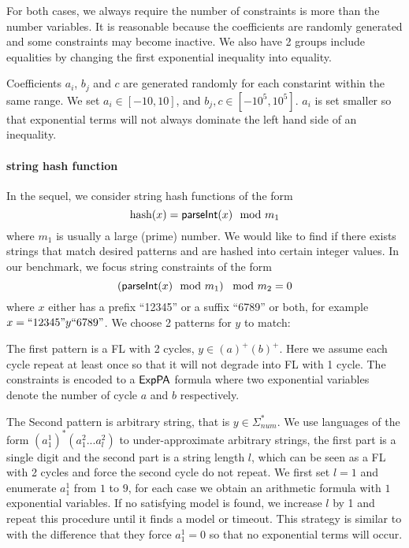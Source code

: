 For both cases, we always require the number of constraints is more than the number variables. It is reasonable because the coefficients are randomly generated and some constraints may become inactive. We also have 2 groups include equalities by changing the first exponential inequality into equality.  

Coefficients $a_i$, $b_j$ and $c$ are generated randomly for each constarint within the same range. We set $a_i\in [-10,10]$, and $b_j,c\in[-10^5,10^5]$. $a_i$ is set smaller so that exponential terms will not always dominate the left hand side of an inequality.

\paragraph{string hash function}

In the sequel, we consider string hash functions of the form  
\begin{equation}
    \text{hash}(x)= \textsf{parseInt}(x) \mod m_1  \notag
\end{equation}
where $m_1$ is usually a large (prime) number. We would like to find if there exists strings that match desired patterns and are hashed into certain integer values. In our benchmark, we focus string constraints of the form
\begin{equation}
    \left( \textsf{parseInt}(x) \mod m_1\right) \mod m_2 = 0   \notag
\end{equation}
where $x$ either has a prefix ``12345'' or a suffix ``6789'' or both, for example $x=``12345"y``6789"$. We choose 2 patterns for $y$ to match: 

The first pattern is a FL with 2 cycles, $y \in (a)^+(b)^+$. Here we assume each cycle repeat at least once so that it will not degrade into FL with 1 cycle. The constraints is encoded to a ${\sf ExpPA}$ formula where two exponential variables denote the number of cycle $a$ and $b$ respectively.

The Second pattern is arbitrary string, that is $y\in \Sigma_{num}^*$. We use languages of the form $(a^1_1)^* (a^2_1...a^2_l)$ to under-approximate arbitrary strings, the first part is a single digit and the second part is a string length $l$, which can be seen as a FL with 2 cycles and force the second cycle do not repeat. We first set $l=1$ and enumerate $a^1_1$ from $1$ to $9$, for each case we obtain an arithmetic formula with $1$ exponential variables. If no satisfying model is found, we increase $l$ by 1 and repeat this procedure until it finds a model or timeout. This strategy is similar to \cite{Abdulla2020} with the difference that they force $a^1_1=0$ so that no exponential terms will occur.


